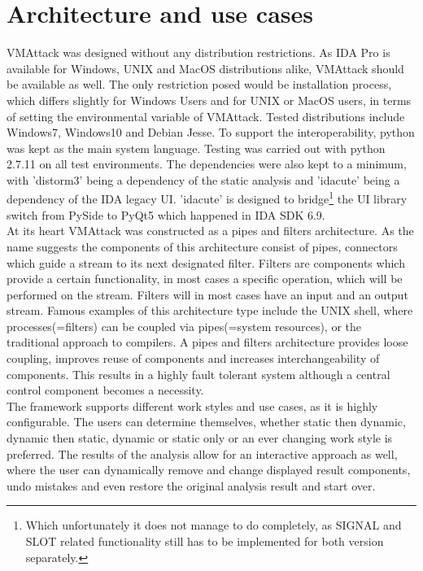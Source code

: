 \documentclass[10pt,twoside,a4paper,bibliography=totoc]{scrbook}
\begin{document}
\section{Architecture and use cases}
\label{sec3:arch}
VMAttack was designed without any distribution restrictions. As IDA Pro is available for Windows, UNIX and MacOS distributions alike, VMAttack should be available as well. The only restriction posed would be installation process, which differs slightly for Windows Users and for UNIX or MacOS users, in terms of setting the environmental variable of VMAttack. Tested distributions include Windows7, Windows10 and Debian Jesse. 
To support the interoperability, python was kept as the main system language. Testing was carried out with python 2.7.11 on all test environments.
The dependencies were also kept to a minimum, with 'distorm3' being a dependency of the static analysis and 'idacute' being a dependency of the IDA legacy UI. 'idacute' is designed to bridge\footnote{Which unfortunately it does not manage to do completely, as SIGNAL and SLOT related functionality still has to be implemented for both version separately.} the UI library switch from PySide to PyQt5 which happened in IDA SDK 6.9.\\
At its heart VMAttack was constructed as a pipes and filters architecture. As the name suggests the components of this architecture consist of pipes, connectors which guide a stream to its next designated filter. Filters are components which provide a certain functionality, in most cases a specific operation, which will be performed on the stream.
Filters will in most cases have an input and an output stream. Famous examples of this architecture type include the UNIX shell, where processes(=filters) can be coupled via pipes(=system resources), or the traditional approach to compilers. A pipes and filters architecture provides loose coupling, improves reuse of components and increases interchangeability of components. This results in a highly fault tolerant system although a central control component becomes a necessity.\\
The framework supports different work styles and use cases, as it is highly configurable. The users can determine themselves, whether static then dynamic, dynamic then static, dynamic or static only or an ever changing work style is preferred. The results of the analysis allow for an interactive approach as well, where the user can dynamically remove and change displayed result components, undo mistakes and even restore the original analysis result and start over. \\
\end{document}
